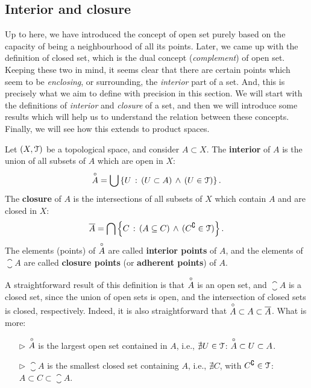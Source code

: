 \subsection{Interior and closure}\label{subsec:interior-closure}

Up to here, we have introduced the concept of open set purely based on the capacity of being a neighbourhood of all its points. Later, we came up with the definition of closed set, which is the dual concept (\emph{complement}) of open set. Keeping these two in mind, it seems clear that there are certain points which seem to be \emph{enclosing}, or surrounding, the \emph{interior} part of a set. And, this is precisely what we aim to define with precision in this section. We will start with the definitions of \emph{interior} and \emph{closure} of a set, and then we will introduce some results which will help us to understand the relation between these concepts. Finally, we will see how this extends to product spaces.

\begin{definition}
	\label{def:interior-closure}
	Let $(X,\EuScript{T})$ be a topological space, and consider $A\subset X$.
	The \textbf{interior} of $A$ is the union of all subsets of $A$ which are open in $X$:
	$$
		\overset{\circ}{A}=\bigcup\left\{U\,:\,(U\subset A)\,\land\,(U\in\EuScript{T})\right\}.
	$$
	The \textbf{closure} of $A$ is the intersections of all subsets of $X$ which contain $A$ and are closed in $X$:
	$$
	  \overline{A}=\bigcap\left\{C\,:\,(A\subseteq C)\,\land\,(C^\complement\in\EuScript{T})\right\}.
	$$
	The elements (points) of $\overset{\circ}{A}$ are called \textbf{interior points} of $A$, and the elements of $\closure{A}$ are called \textbf{closure points} (or \textbf{adherent points}) of $A$.
\end{definition}

\begin{remark}
	A straightforward result of this definition is that $\overset{\circ}{A}$ is an open set, and $\closure{A}$ is a closed set, since the union of open sets is open, and the intersection of closed sets is closed, respectively.
	Indeed, it is also straightforward that $\overset{\circ}{A}\subset A\subset \overline{A}$.
	What is more:
	\begin{itemize}
		\item[$\triangleright$] $\overset{\circ}{A}$ is the largest open set contained in $A$, i.e., $\nexists U\in \EuScript{T}$: $\overset{\circ}{A}\subset U\subset A$.
		\item[$\triangleright$] $\closure{A}$ is the smallest closed set containing $A$, i.e., $\nexists C$, with $C^\complement\in \EuScript{T}$: $A\subset C\subset \closure{A}$.
	\end{itemize}
\end{remark}